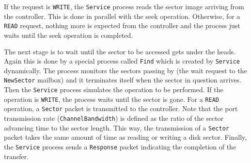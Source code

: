 If the request is {\tt WRITE}, the {\tt Service} process reads the sector
image arriving from the controller.
This is done in parallel with the seek operation.
Otherwise, for a {\tt READ} request, nothing more is expected from the
controller and the process just waits until the seek operation
is completed.

The next stage is to wait until the sector to be accessed gets under the
heads.
Again this is done by a special process called {\tt Find} which
is created by {\tt Service} dynamically.
The process monitors the sectors passing by (the wait request to the
{\tt NewSector} mailbox) and it
terminates itself when the sector in question arrives.
Then the {\tt Service} process simulates the operation to be performed.
If the operation is {\tt WRITE}, the process waits until the sector is
gone.
For a {\tt READ} operation, a {\tt Sector} packet is transmitted to the
controller.
Note that the port transmission rate ({\tt ChannelBandwidth}) is defined as
the ratio of the sector advancing time to the sector length.
This way, the transmission of a {\tt Sector} packet takes the same
amount of time as reading or writing a disk sector.
Finally, the {\tt Service} process sends a {\tt Response} packet indicating
the completion of the transfer.


